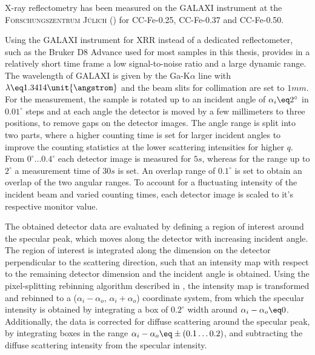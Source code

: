\documentclass[\main/dresen_thesis.tex]{subfiles}
\begin{document}
    X-ray reflectometry has been measured on the GALAXI instrument at the \textsc{Forschungszentrum J\"ulich} () for CC-Fe-0.25, CC-Fe-0.37 and CC-Fe-0.50.

    Using the GALAXI instrument for XRR instead of a dedicated reflectometer, such as the Bruker D8 Advance used for most samples in this thesis, provides in a relatively short time frame a low signal-to-noise ratio and a large dynamic range.
    The wavelength of GALAXI is given by the Ga-K$\alpha$ line with $\lambda \eq 1.3414 \unit{\angstrom}$ and the beam slits for collimation are set to $1 \unit{mm}$.
    For the measurement, the sample is rotated up to an incident angle of $\alpha_i \eq 2^\circ$ in $0.01 ^\circ$ steps and at each angle the detector is moved by a few millimeters to three positions, to remove gaps on the detector images.
    The angle range is split into two parts, where a higher counting time is set for larger incident angles to improve the counting statistics at the lower scattering intensities for higher $q$.
    From $0 ^\circ \ldots 0.4 ^\circ$ each detector image is measured for $5 \unit{s}$, whereas for the range up to $2 ^\circ$ a measurement time of $30 \unit{s}$ is set.
    An overlap range of $0.1 ^\circ$ is set to obtain an overlap of the two angular ranges.
    To account for a fluctuating intensity of the incident beam and varied counting times, each detector image is scaled to it's respective monitor value.

    The obtained detector data are evaluated by defining a region of interest around the specular peak, which moves along the detector with increasing incident angle.
    The region of interest is integrated along the dimension on the detector perpendicular to the scattering direction, such that an intensity map with respect to the remaining detector dimension and the incident angle is obtained.
    Using the pixel-splitting rebinning algorithm described in , the intensity map is transformed and rebinned to a ($\alpha_i - \alpha_o$, $\alpha_i+\alpha_o$) coordinate system, from which the specular intensity is obtained by integrating a box of $0.2 ^\circ$ width around $\alpha_i - \alpha_o \eq 0$.
    Additionally, the data is corrected for diffuse scattering around the specular peak, by integrating boxes in the range $\alpha_i - \alpha_o \eq \pm (0.1 \ldots 0.2)$, and subtracting the diffuse scattering intensity from the specular intensity.
\end{document}
